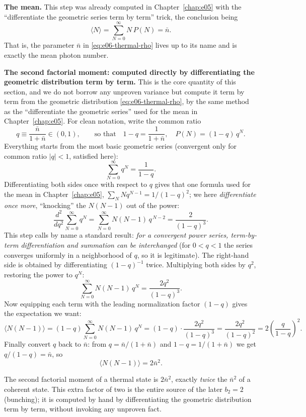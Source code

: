 \textbf{The mean.} This step was already computed in Chapter~\ref{chap:e05} with the ``differentiate the geometric series term by term'' trick, the conclusion being
\[
  \langle N\rangle=\sum_{N=0}^{\infty}N\,P(N)=\bar n.
\]
That is, the parameter \(\bar n\) in \eqref{eq:e06-thermal-rho} lives up to its name and is exactly the mean photon number.

\textbf{The second factorial moment: computed directly by differentiating the geometric distribution term by term.} This is the core quantity of this section, and we do not borrow any unproven variance but compute it term by term from the geometric distribution \eqref{eq:e06-thermal-rho}, by the same method as the ``differentiate the geometric series'' used for the mean in Chapter~\ref{chap:e05}. For clean notation, write the common ratio
\[
  q\equiv\frac{\bar n}{1+\bar n}\in(0,1),
  \qquad\text{so that}\quad 1-q=\frac{1}{1+\bar n},\quad P(N)=(1-q)\,q^{N}.
\]
Everything starts from the most basic geometric series (convergent only for common ratio \(|q|<1\), satisfied here):
\[
  \sum_{N=0}^{\infty}q^{N}=\frac{1}{1-q}.
\]
Differentiating both sides once with respect to \(q\) gives that one formula used for the mean in Chapter~\ref{chap:e05}, \(\sum_N N q^{N-1}=1/(1-q)^2\); we here \emph{differentiate once more}, ``knocking'' the \(N(N-1)\) out of the power:
\[
  \frac{d^{2}}{dq^{2}}\sum_{N=0}^{\infty}q^{N}
  =\sum_{N=0}^{\infty}N(N-1)\,q^{\,N-2}
  =\frac{2}{(1-q)^{3}} .
\]
This step calls by name a standard result: \emph{for a convergent power series, term-by-term differentiation and summation can be interchanged} (for \(0<q<1\) the series converges uniformly in a neighborhood of \(q\), so it is legitimate). The right-hand side is obtained by differentiating \((1-q)^{-1}\) twice. Multiplying both sides by \(q^{2}\), restoring the power to \(q^{N}\):
\[
  \sum_{N=0}^{\infty}N(N-1)\,q^{N}=\frac{2q^{2}}{(1-q)^{3}} .
\]
Now equipping each term with the leading normalization factor \((1-q)\) gives the expectation we want:
\[
  \langle N(N-1)\rangle
  =(1-q)\sum_{N=0}^{\infty}N(N-1)\,q^{N}
  =(1-q)\cdot\frac{2q^{2}}{(1-q)^{3}}
  =\frac{2q^{2}}{(1-q)^{2}}
  =2\left(\frac{q}{1-q}\right)^{2}.
\]
Finally convert \(q\) back to \(\bar n\): from \(q=\bar n/(1+\bar n)\) and \(1-q=1/(1+\bar n)\) we get \(q/(1-q)=\bar n\), so
\begin{equation}
  \langle N(N-1)\rangle=2\bar n^{2}.
  \label{eq:e06-thermal-fm}
\end{equation}
\begin{formulaexplain}
The second factorial moment of a thermal state is \(2\bar n^2\), exactly \emph{twice} the \(\bar n^2\) of a coherent state. This extra factor of two is the entire source of the later \(b_2=2\) (bunching); it is computed by hand by differentiating the geometric distribution term by term, without invoking any unproven fact.
\end{formulaexplain}

